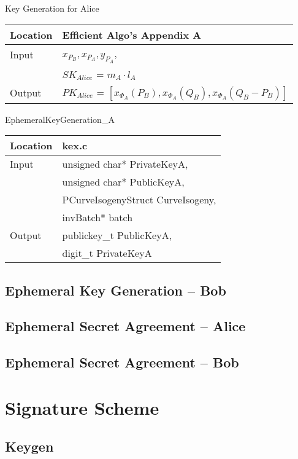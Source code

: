 \documentclass[10pt]{article}
\begin{document}
\parbox[t]{.45\linewidth}{
\centering
Key Generation for Alice
\begin{tabular}{@{}ll@{}}
	\toprule
	Location & Efficient Algo's Appendix A \\
	\midrule
	Input & $x_{P_{B}}, x_{P_{A}}, y_{P_{A}}$,\\
	& $SK_{Alice}$ = $m_{A} \cdot l_{A}$\\
	\midrule
	Output & $PK_{Alice}$ = $[x_{\Phi_{A}}(P_{B}), x_{\Phi_{A}}(Q_{B}), x_{\Phi_{A}}(Q_{B} - P_{B})]$\\
	\bottomrule
\end{tabular}}
\hfill
\parbox[t]{.45\linewidth}{
\centering
EphemeralKeyGeneration\_A
\begin{tabular}{@{}ll@{}}
	\toprule
	Location & kex.c \\
	\midrule
	Input & unsigned char* PrivateKeyA,\\
	& unsigned char* PublicKeyA,\\
	& PCurveIsogenyStruct CurveIsogeny,\\
	& invBatch* batch\\
	\midrule
	Output & publickey\_t PublicKeyA,\\
	& digit\_t PrivateKeyA\\
	\bottomrule
\end{tabular}}

\subsection{Ephemeral Key Generation -- Bob}

\subsection{Ephemeral Secret Agreement -- Alice}

\subsection{Ephemeral Secret Agreement -- Bob}

\section{Signature Scheme}

\subsection{Keygen}
\end{document}
